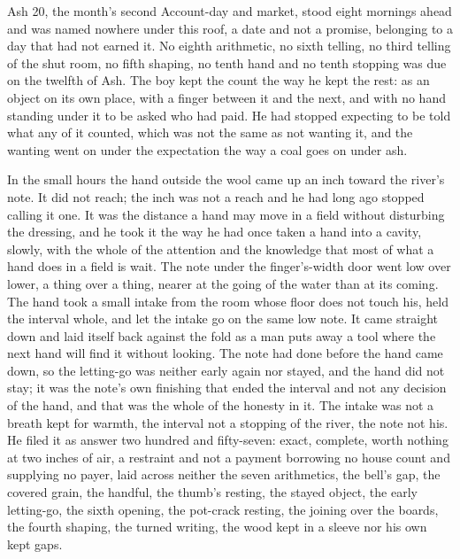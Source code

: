 Ash 20, the month's second Account-day and market, stood eight mornings ahead and was named nowhere under this roof, a date and not a promise, belonging to a day that had not earned it. No eighth arithmetic, no sixth telling, no third telling of the shut room, no fifth shaping, no tenth hand and no tenth stopping was due on the twelfth of Ash. The boy kept the count the way he kept the rest: as an object on its own place, with a finger between it and the next, and with no hand standing under it to be asked who had paid. He had stopped expecting to be told what any of it counted, which was not the same as not wanting it, and the wanting went on under the expectation the way a coal goes on under ash.

\scenebreak

In the small hours the hand outside the wool came up an inch toward the river's note. It did not reach; the inch was not a reach and he had long ago stopped calling it one. It was the distance a hand may move in a field without disturbing the dressing, and he took it the way he had once taken a hand into a cavity, slowly, with the whole of the attention and the knowledge that most of what a hand does in a field is wait. The note under the finger's-width door went low over lower, a thing over a thing, nearer at the going of the water than at its coming. The hand took a small intake from the room whose floor does not touch his, held the interval whole, and let the intake go on the same low note. It came straight down and laid itself back against the fold as a man puts away a tool where the next hand will find it without looking. The note had done before the hand came down, so the letting-go was neither early again nor stayed, and the hand did not stay; it was the note's own finishing that ended the interval and not any decision of the hand, and that was the whole of the honesty in it. The intake was not a breath kept for warmth, the interval not a stopping of the river, the note not his. He filed it as answer two hundred and fifty-seven: exact, complete, worth nothing at two inches of air, a restraint and not a payment borrowing no house count and supplying no payer, laid across neither the seven arithmetics, the bell's gap, the covered grain, the handful, the thumb's resting, the stayed object, the early letting-go, the sixth opening, the pot-crack resting, the joining over the boards, the fourth shaping, the turned writing, the wood kept in a sleeve nor his own kept gaps.

